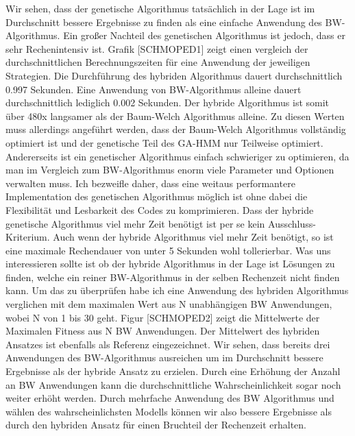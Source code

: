 Wir sehen, dass der genetische Algorithmus tatsächlich in der Lage ist im Durchschnitt bessere Ergebnisse zu finden als eine einfache Anwendung des BW-Algorithmus. Ein großer Nachteil des genetischen Algorithmus ist jedoch, dass er sehr Rechenintensiv ist. Grafik [SCHMOPED1] zeigt einen vergleich der durchschnittlichen Berechnungszeiten für eine Anwendung der jeweiligen Strategien. Die Durchführung des hybriden Algorithmus dauert durchschnittlich 0.997 Sekunden. Eine Anwendung von BW-Algorithmus alleine dauert durchschnittlich lediglich 0.002 Sekunden. Der hybride Algorithmus ist somit über 480x langsamer als der Baum-Welch Algorithmus alleine.
Zu diesen Werten muss allerdings angeführt werden, dass der Baum-Welch Algorithmus vollständig optimiert ist und der genetische Teil des GA-HMM nur Teilweise optimiert. Andererseits ist ein genetischer Algorithmus einfach schwieriger zu optimieren, da man im Vergleich zum BW-Algorithmus enorm viele Parameter und Optionen verwalten muss. Ich bezweifle daher, dass eine weitaus performantere Implementation des genetischen Algorithmus möglich ist ohne dabei die Flexibilität und Lesbarkeit des Codes zu komprimieren. Dass der hybride genetische Algorithmus viel mehr Zeit benötigt ist per se kein Ausschluss-Kriterium. Auch wenn der hybride Algorithmus viel mehr Zeit benötigt, so ist eine maximale Rechendauer von unter 5 Sekunden wohl tollerierbar. Was uns interessieren sollte ist ob der hybride Algorithmus in der Lage ist Lösungen zu finden, welche ein reiner BW-Algorithmus in der selben Rechenzeit nicht finden kann. Um das zu überprüfen habe ich eine Anwendung des hybriden Algorithmus verglichen mit dem maximalen Wert aus N unabhängigen BW Anwendungen, wobei N von 1 bis 30 geht. Figur [SCHMOPED2] zeigt die Mittelwerte der Maximalen Fitness aus N BW Anwendungen. Der Mittelwert des hybriden Ansatzes ist ebenfalls als Referenz eingezeichnet. Wir sehen, dass bereits drei Anwendungen des BW-Algorithmus ausreichen um im Durchschnitt bessere Ergebnisse als der hybride Ansatz zu erzielen. Durch eine Erhöhung der Anzahl an BW Anwendungen kann die durchschnittliche Wahrscheinlichkeit sogar noch weiter erhöht werden. Durch mehrfache Anwendung des BW Algorithmus und wählen des wahrscheinlichsten Modells können wir also bessere Ergebnisse als durch den hybriden Ansatz für einen Bruchteil der Rechenzeit erhalten.

